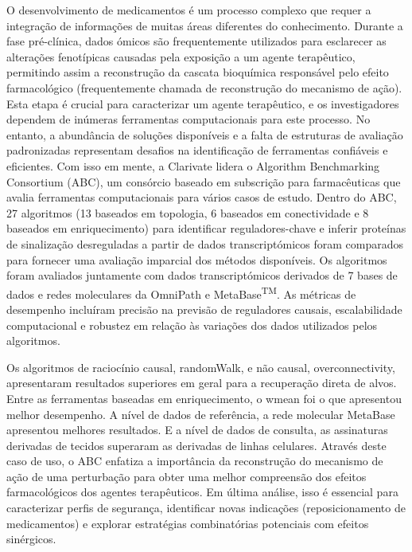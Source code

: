 ﻿%

%

O desenvolvimento de medicamentos é um processo complexo que requer a integração de informações de muitas áreas diferentes do conhecimento.
Durante a fase pré-clínica, dados ómicos são frequentemente utilizados para esclarecer as alterações fenotípicas causadas pela exposição a um agente terapêutico, permitindo assim a reconstrução da cascata bioquímica responsável pelo efeito farmacológico (frequentemente chamada de reconstrução do mecanismo de ação).
Esta etapa é crucial para caracterizar um agente terapêutico, e os investigadores dependem de inúmeras ferramentas computacionais para este processo.
No entanto, a abundância de soluções disponíveis e a falta de estruturas de avaliação padronizadas representam desafios na identificação de ferramentas confiáveis e eficientes.
Com isso em mente, a Clarivate lidera o Algorithm Benchmarking Consortium (ABC), um consórcio baseado em subscrição para farmacêuticas que avalia ferramentas computacionais para vários casos de estudo.
Dentro do ABC, 27 algoritmos (13 baseados em topologia, 6 baseados em conectividade e 8 baseados em enriquecimento) para identificar reguladores-chave e inferir proteínas de sinalização desreguladas a partir de dados transcriptómicos foram comparados para fornecer uma avaliação imparcial dos métodos disponíveis.
Os algoritmos foram avaliados juntamente com dados transcriptómicos derivados de 7 bases de dados e redes moleculares da OmniPath e MetaBase\textsuperscript{TM}.
As métricas de desempenho incluíram precisão na previsão de reguladores causais, escalabilidade computacional e robustez em relação às variações dos dados utilizados pelos algoritmos.

Os algoritmos de raciocínio causal, randomWalk, e não causal, overconnectivity, apresentaram resultados superiores em geral para a recuperação direta de alvos.
Entre as ferramentas baseadas em enriquecimento, o wmean foi o que apresentou melhor desempenho.
A nível de dados de referência, a rede molecular MetaBase apresentou melhores resultados.
E a nível de dados de consulta, as assinaturas derivadas de tecidos superaram as derivadas de linhas celulares.
Através deste caso de uso, o ABC enfatiza a importância da reconstrução do mecanismo de ação de uma perturbação para obter uma melhor compreensão dos efeitos farmacológicos dos agentes terapêuticos.
Em última análise, isso é essencial para caracterizar perfis de segurança, identificar novas indicações (reposicionamento de medicamentos) e explorar estratégias combinatórias potenciais com efeitos sinérgicos.



